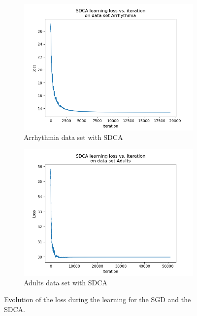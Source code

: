 \documentclass{article}
\begin{document}
\begin{figure}[H]
	\begin{subfigure}[t]{0.45\linewidth}
		\includegraphics[width=\linewidth]{arrhythmia_sdca.png}
		\caption{Arrhythmia data set with SDCA}
	\end{subfigure}
	\begin{subfigure}[t]{0.45\linewidth}
		\includegraphics[width=\linewidth]{adults_sdca.png}
		\caption{Adults data set with SDCA}
	\end{subfigure}

	\caption{Evolution of the loss during the learning for the SGD and the SDCA.}
\end{figure}
\end{document}
